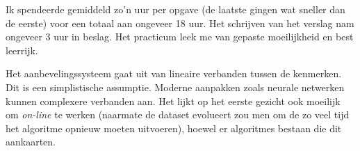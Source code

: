 
Ik spendeerde gemiddeld zo'n uur per opgave (de laatste gingen wat sneller dan de eerste) voor een totaal aan ongeveer 18 uur. Het schrijven van het verslag nam ongeveer 3 uur in beslag. Het practicum leek me van gepaste moeilijkheid en best leerrijk.\\

\par\noindent Het aanbevelingssysteem gaat uit van lineaire verbanden tussen de kenmerken. Dit is een simplistische assumptie. Moderne aanpakken zoals neurale netwerken kunnen complexere verbanden aan. Het lijkt op het eerste gezicht ook moeilijk om \textit{on-line} te werken (naarmate de dataset evolueert zou men om de zo veel tijd het algoritme opnieuw moeten uitvoeren), hoewel er algoritmes bestaan die dit aankaarten.